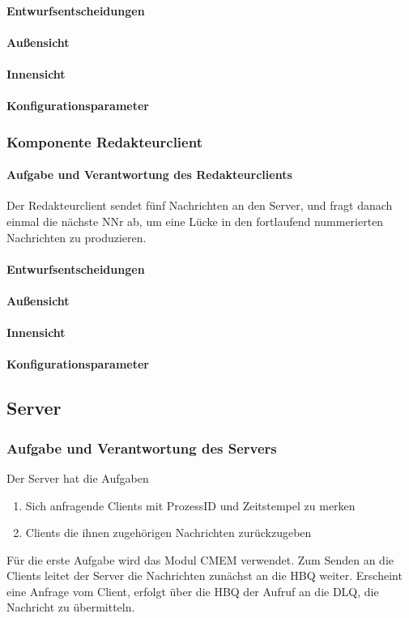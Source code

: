 \documentclass{article}
\begin{document}
			\paragraph{Entwurfsentscheidungen}
			\paragraph{Außensicht}
			\paragraph{Innensicht}
			\paragraph{Konfigurationsparameter}
		
		\subsubsection{Komponente Redakteurclient}
		
		    \paragraph{Aufgabe und Verantwortung des Redakteurclients}
		    Der Redakteurclient sendet fünf Nachrichten an den Server, 
		    und fragt danach einmal die nächste NNr ab, um eine Lücke in den fortlaufend 
		    nummerierten Nachrichten zu produzieren.
			\paragraph{Entwurfsentscheidungen}
			\paragraph{Außensicht}
			\paragraph{Innensicht}
			\paragraph{Konfigurationsparameter}
			
	\subsection{Server}
	
		\subsubsection{Aufgabe und Verantwortung des Servers}
			Der Server hat die Aufgaben  
			\begin{enumerate}
    			\item{Sich anfragende Clients mit ProzessID und Zeitstempel zu merken}
    			\item{Clients die ihnen zugehörigen Nachrichten zurückzugeben}
			\end{enumerate}
			Für die erste Aufgabe wird das Modul CMEM verwendet. 
			Zum Senden an die Clients leitet der Server die Nachrichten zunächst an die HBQ weiter. 
			Erscheint eine Anfrage vom Client, erfolgt über die HBQ der Aufruf an die DLQ, 
			die Nachricht zu übermitteln.
\end{document}
